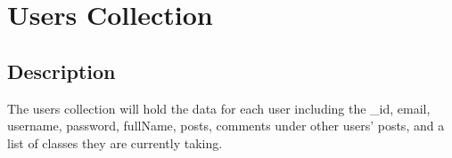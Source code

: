 \documentclass[preprint,11pt,3p]{article}
\author{%
    Eric Altenburg \\
    \texttt{ealtenbu@stevens.edu}\vspace{20pt} \\
   	Daniel Kimball \\
    \texttt{dkimball@stevens.edu}\vspace{20pt} \\
    Hamzah Nizami \\
    \texttt{hnizami1@stevens.edu}\vspace{20pt} \\
    Max Shi \\
    \texttt{mshi7@stevens.edu}
    }
\makeatletter
\def\printauthor{%
    {\large \@author}}
\newcommand\titlepagedecoration{%
\begin{tikzpicture}[remember picture,overlay,shorten >= -10pt]

	\coordinate (aux1) at ([yshift=-15pt]current page.north east);
	\coordinate (aux2) at ([yshift=-410pt]current page.north east);
	\coordinate (aux3) at ([xshift=-4.5cm]current page.north east);
	\coordinate (aux4) at ([yshift=-150pt]current page.north east);

	\begin{scope}[titlepagecolor!40,line width=12pt,rounded corners=12pt]
		\draw
		  (aux1) -- coordinate (a)
		  ++(225:5) --
		  ++(-45:5.1) coordinate (b);
		\draw[shorten <= -10pt]
		  (aux3) --
		  (a) --
		  (aux1);
		\draw[opacity=0.6,titlepagecolor,shorten <= -10pt]
		  (b) --
		  ++(225:2.2) --
		  ++(-45:2.2);
	\end{scope}
	\draw[titlepagecolor,line width=8pt,rounded corners=8pt,shorten <= -10pt]
	  (aux4) --
	  ++(225:0.8) --
	  ++(-45:0.8);
	\begin{scope}[titlepagecolor!70,line width=6pt,rounded corners=8pt]
		\draw[shorten <= -10pt]
		  (aux2) --
		  ++(225:3) coordinate[pos=0.45] (c) --
		  ++(-45:3.1);
		\draw
		  (aux2) --
		  (c) --
		  ++(135:2.5) --
		  ++(45:2.5) --
		  ++(-45:2.5) coordinate[pos=0.3] (d);   
		\draw 
		  (d) -- +(45:1);
	\end{scope}
\end{tikzpicture}%
}
\makeatother
\begin{document}




\newpage

\tableofcontents
\newpage



\section{Users Collection}

\subsection{Description}
	The users collection will hold the data for each user including the _id, email, username, password, fullName, posts, comments under other users' posts, and a list of classes they are currently taking.
\end{document}
